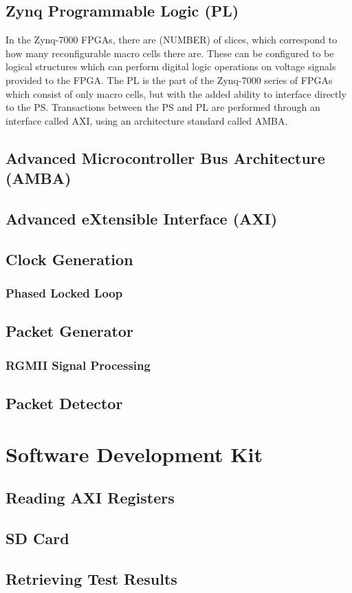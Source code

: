 \subsection{Zynq Programmable Logic (PL)}

\par In the Zynq-7000 FPGAs, there are (NUMBER) of slices, which correspond to how many reconfigurable macro cells there are. These can 
be configured to be logical structures which can perform digital logic operations on voltage signals provided to the FPGA. The PL is 
the part of the Zynq-7000 series of FPGAs which consist of only macro cells, but with the added ability to interface directly to the 
PS. Transactions between the PS and PL are performed through an interface called AXI, using an architecture standard called AMBA.

\subsection{Advanced Microcontroller Bus Architecture (AMBA)}
\subsection{Advanced eXtensible Interface (AXI)}
\subsection{Clock Generation}
\subsubsection{Phased Locked Loop}
\subsection{Packet Generator}
\subsubsection{RGMII Signal Processing}
\subsection{Packet Detector}
\section{Software Development Kit}
\subsection{Reading AXI Registers}
\subsection{SD Card}
\subsection{Retrieving Test Results}
